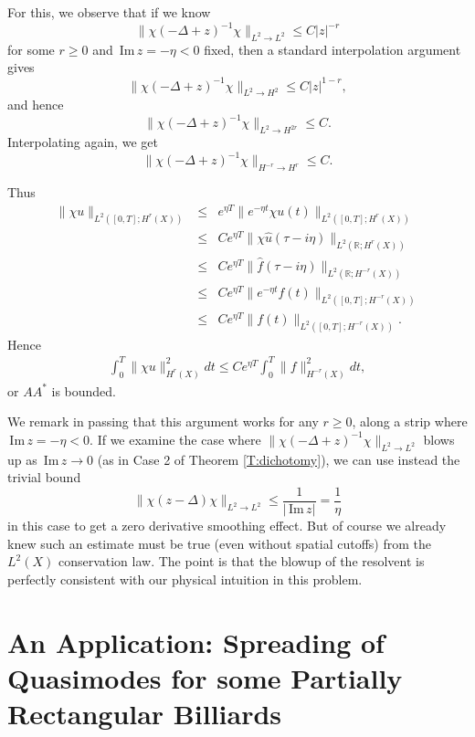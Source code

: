 \documentclass[twoside, final]{amsart}
\theoremstyle{definition}
\numberwithin{equation}{section}
\begin{document}
For this, we observe that if we know
\[
\| \chi ( -\Delta +z)^{-1} \chi \|_{L^2 \to L^2} {\leqslant} C | z |^{-r}
\]
for some $r {\geqslant} 0$ and ${\,\mathrm{Im}\,} z = -\eta<0$ fixed, then a standard interpolation argument gives
\[
\| \chi ( -\Delta +z)^{-1} \chi \|_{L^2 \to H^2} {\leqslant} C | z |^{1-r},
\]
and hence 
\[
\| \chi ( -\Delta +z)^{-1} \chi \|_{L^2 \to H^{2r}} {\leqslant} C .
\]
Interpolating again, we get
\[
\| \chi ( -\Delta +z)^{-1} \chi \|_{H^{-r} \to H^r} {\leqslant} C .
\]

 Thus
\begin{eqnarray*}
\| \chi  u \|_{L^2( [0,T] ; H^{r}(X))} & {\leqslant} &
e^{\eta T} \| e^{-\eta t} \chi u(t) \|_{L^2( [0,T] ;
  H^{r}(X))} \\
& {\leqslant} & Ce^{\eta T} \| \chi \hat{u}(\tau - i \eta) \|_{L^2(
  {{\mathbb R}} ; H^{r}(X))} \\
& {\leqslant} & Ce^{\eta T} \| \hat f( \tau - i \eta) \|_{L^2( {{\mathbb R}} ; H^{-r}(X))} \\
& {\leqslant} & C e^{\eta T} \|e^{- \eta t} f(t) \|_{L^2([0,T];  H^{-r}(X))} \\
& {\leqslant} & C e^{\eta T} \| f(t) \|_{L^2([0,T];  H^{-r}(X))}.
\end{eqnarray*}
Hence 
\begin{eqnarray*}
\int_0^T \|\chi u \|_{H^{r}(X)}^2 dt {\leqslant} C e^{ \eta
  T} \int_0^T \| f \|_{H^{-r}(X)}^2 dt,
\end{eqnarray*}
or $A A^*$ is bounded.  

We remark in passing that this argument works for any $r {\geqslant} 0$,
along a strip where ${\,\mathrm{Im}\,} z = - \eta <0$.  If we examine the case where
$\|\chi ( - \Delta +z )^{-1} \chi \|_{L^2 \to L^2}$ blows up as ${\,\mathrm{Im}\,} z \to
0$ (as in Case 2 of Theorem \ref{T:dichotomy}), we can use instead the trivial bound
\[
\|\chi (z - \Delta ) \chi \|_{L^2 \to L^2} {\leqslant} \frac{1}{| {\,\mathrm{Im}\,} z | } =
\frac{1}{\eta}
\]
in this case to get a zero derivative smoothing effect.  But of course
we already knew such an estimate must be true (even without spatial
cutoffs) from the $L^2(X)$ conservation law.  The point is that the
blowup of the resolvent is perfectly consistent with our physical
intuition in this problem.

\section{An Application: Spreading of Quasimodes for some Partially
  Rectangular Billiards}
\end{document}
